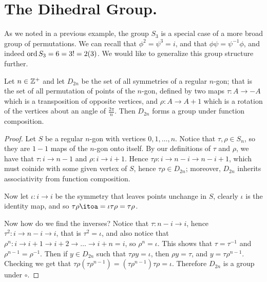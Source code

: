 
\section{The Dihedral Group.}
\label{section1}

As we noted in a previous example, the group $S_3$ is a special case of a more broad group of
permutations. We can recall that  $\phi^2=\psi^3=i$, and that  $\phi\psi=\psi^{-1}\phi$, and indeed
$\operatorname{ord}{S_3}=6=3!=2(3)$. We would like to generalize this group structure further.

\begin{theorem}\label{1.1.2}
    Let $n \in \mathbb{Z}^+$ and let $D_{2n}$ be the set of all symmetries of a regular $n$-gon; that is the
    set of all permutation of points of the $n$-gon, defined by two maps $\tau:A \rightarrow -A$
    which is a transposition of opposite vertices, and $\rho:A \rightarrow A+1$ which is a rotation
    of the vertices about an angle of $\frac{2\pi}{n}$. Then $D_{2n}$ forms a group under function
    composition.
\end{theorem}
\begin{proof}
    Let $S$ be a regular  $n$-gon with vertices  $0,1, \dots, n$. Notice that  $\tau,\rho \in S_n$,
    so they are  $1-1$ maps of the  $n$-gon onto itself. By our definitions of  $\tau$ and  $\rho$,
    we have that  $\tau:i \rightarrow n-1$ and  $\rho:i \rightarrow i+1$. Hence  $\tau\rho:i
    \rightarrow n-i \rightarrow n-i+1$, which must coinide with some given vertex of $S$, hence
    $\tau\rho \in D_{2n}$; moreover, $D_{2n}$ inherits associativity from function composition.

    Now let $\iota:i \rightarrow i$ be the symmetry that leaves points unchange in $S$, clearly
    $\iota$ is the identity map, and so  $\tau\rho\itoa=\iota\tau\rho=\tau\rho$.

    Now how do we find the inverses? Notice that  $\tau:n-i \rightarrow i$, hence  $\tau^2:i
    \rightarrow n-i \rightarrow i$, that is $\tau^2=\iota$, and also notice that  $\rho^n:i
    \rightarrow i+1 \rightarrow i+2 \rightarrow \dots \rightarrow i+n=i$, so  $\rho^n=\iota$. This
    shows that  $\tau=\tau^{-1}$ and $\rho^{n-1}=\rho^{-1}$.  Then if $y \in D_{2n}$ such that
    $\tau\rho y=\iota$, then  $\rho y=\tau$, and  $y=\tau\rho^{n-1}$. Checking we get 
    that $\tau\rho(\tau\rho^{n-1})=(\tau\rho^{n-1})\tau\rho=\iota$. Therefore $D_{2n}$ is a group
    under $\circ$.
\end{proof}

